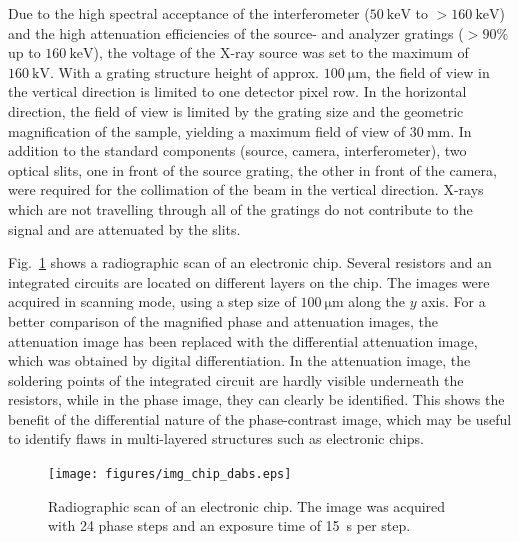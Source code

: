 \documentclass[aip,apl,amsmath,amssymb,floatfix,reprint,a4paper]{revtex4-1}
\begin{document}
Due to the high spectral acceptance \cite{Weitkamp2005,Thuering2013c} of the
interferometer ($\SI{50}{\kilo\electronvolt}$ to
$>\SI{160}{\kilo\electronvolt}$) and the high attenuation efficiencies of
the source- and analyzer gratings ($>90\%$ up to
$\SI{160}{\kilo\electronvolt}$), the voltage of the X-ray source was set to
the maximum of $\SI{160}{\kilo\volt}$. With a grating structure height of
approx. $\SI{100}{\micro \metre}$, the field of view in the vertical
direction is limited to one detector pixel row. In the horizontal direction,
the field of view is limited by the grating size and the geometric
magnification of the sample, yielding a maximum field of view of
$\SI{30}{\milli\metre}$. In addition to the standard components (source,
camera, interferometer), two optical slits, one in front of the source
grating, the other in front of the camera, were required for the collimation
of the beam in the vertical direction. X-rays which are not travelling
through all of the gratings do not contribute to the signal and are
attenuated by the slits.


Fig.~\ref{Fig:img_chip} shows a radiographic scan of an electronic chip.
Several resistors and an integrated circuits are located on different layers
on the chip. The images were acquired in scanning mode, using a step size of
$\SI{100}{\micro \metre}$ along the $y$ axis. For a better comparison of the
magnified phase and attenuation images, the attenuation image has been
replaced with the differential attenuation image, which was obtained by
digital differentiation. In the attenuation image, the soldering points of
the integrated circuit are hardly visible underneath the resistors, while in
the phase image, they can clearly be identified. This shows the
benefit of the differential nature of the phase-contrast image, which may be
useful to identify flaws in multi-layered structures such as electronic
chips.
\begin{figure}[ht]
    \texttt{[image: figures/img\_chip\_dabs.eps]}
    \caption{Radiographic scan of an electronic chip. The image was acquired
        with 24 phase steps and an exposure time of \SI{15}{\second} per
    step.}
    \label{Fig:img_chip}
\end{figure}
\end{document}
